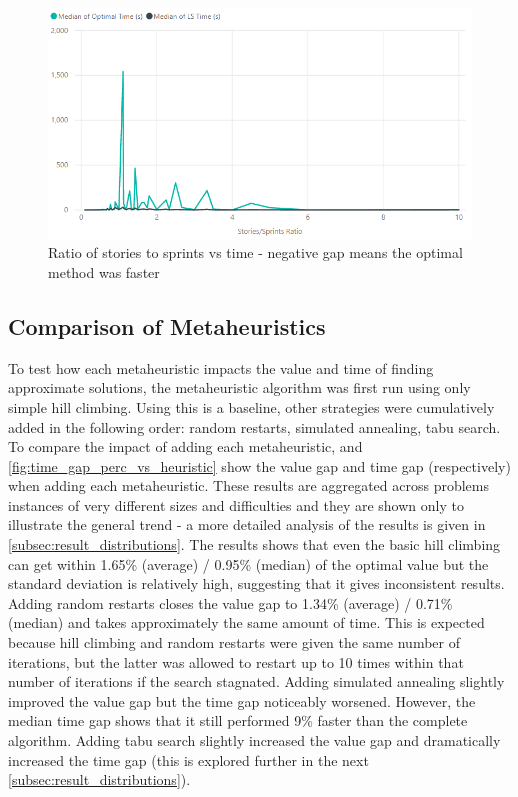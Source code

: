 \begin{figure}[h!]
    \centering
    \includegraphics[width=\textwidth]{Figures/FinalResults/annealing_time_stories_sprints.png}
     \caption{Ratio of stories to sprints vs time - negative gap means the optimal method was faster}
     \label{fig:time_vs_stories_sprints}
\end{figure}

\FloatBarrier

\subsection{Comparison of Metaheuristics}

To test how each metaheuristic impacts the value and time of finding approximate solutions, the metaheuristic algorithm was first run using only simple hill climbing. Using this is a baseline, other strategies were cumulatively added in the following order: random restarts, simulated annealing, tabu search. To compare the impact of adding each metaheuristic,  and \cref{fig:time_gap_perc_vs_heuristic} show the value gap and time gap (respectively) when adding each metaheuristic. These results are aggregated across problems instances of very different sizes and difficulties and they are shown only to illustrate the general trend - a more detailed analysis of the results is given in \cref{subsec:result_distributions}. The results shows that even the basic hill climbing can get within 1.65\% (average) / 0.95\% (median) of the optimal value but the standard deviation is relatively high, suggesting that it gives inconsistent results. Adding random restarts closes the value gap to 1.34\% (average) / 0.71\% (median) and takes approximately the same amount of time. This is expected because hill climbing and random restarts were given the same number of iterations, but the latter was allowed to restart up to 10 times within that number of iterations if the search stagnated. Adding simulated annealing slightly improved the value gap but the time gap noticeably worsened. However, the median time gap shows that it still performed 9\% faster than the complete algorithm. Adding tabu search slightly increased the value gap and dramatically increased the time gap (this is explored further in the next \cref{subsec:result_distributions}).

